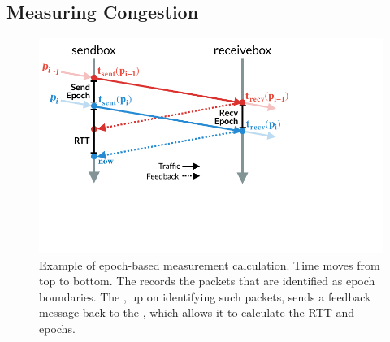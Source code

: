 \subsection{Measuring Congestion}\label{s:measurement}
\begin{figure}
    \centering
    \includegraphics[width=\columnwidth]{img/rate-calculation}
    \caption{Example of epoch-based measurement calculation. Time moves from top to bottom.
    The \inbox records the packets that are identified as epoch boundaries. 
    The \outbox, up on identifying such packets, sends a feedback message back to
    the \inbox, which allows it to calculate the RTT and epochs.
    }\label{fig:ratecalc}
\end{figure}



